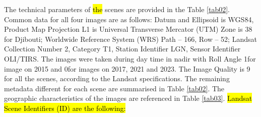 \documentclass[jimaging,article,submit,pdftex,moreauthors]{Definitions/mdpi}
\begin{document}
The\hl{ }technical parameters of \hl{the} scenes are provided in the Table \ref{tab02}. Common data for all four images are as follows: Datum and Ellipsoid is WGS84, Product Map Projection L1 is Universal Transverse Mercator (UTM) Zone is 38 for Djibouti;  Worldwide Reference System (WRS) Path -- 166, Row -- 52; Landsat Collection Number 2, Category T1, Station Identifier LGN, Sensor Identifier OLI/TIRS. The images were taken during day time in nadir with Roll Angle 1\degree  for image on 2015 and 0\degree for images on 2017, 2021 and 2023. The Image Quality is 9 for all the scenes, according to the Landsat specifications. The remaining metadata different for each scene are summarised in Table \ref{tab02}. The geographic characteristics of the images are referenced in Table \ref{tab03}. \hl{Landsat Scene Identifiers (ID) are the following: }
\end{document}
